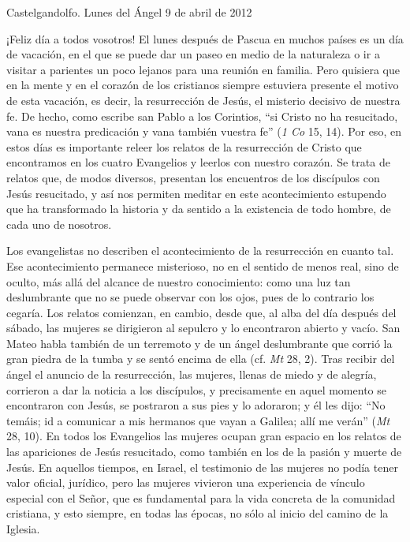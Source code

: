 			\begin{referencia}Castelgandolfo. Lunes del Ángel 9 de abril de 2012\end{referencia}
			
			\begin{body}¡Feliz día a todos vosotros! El lunes después de Pascua en muchos países es un día de vacación, en el que se puede dar un paseo en medio de la naturaleza o ir a visitar a parientes un poco lejanos para una reunión en familia. Pero quisiera que en la mente y en el corazón de los cristianos siempre estuviera presente el motivo de esta vacación, es decir, la resurrección de Jesús, el misterio decisivo de nuestra fe. De hecho, como escribe san Pablo a los Corintios, “si Cristo no ha resucitado, vana es nuestra predicación y vana también vuestra fe” (\textit{1 Co} 15, 14). Por eso, en estos días es importante releer los relatos de la resurrección de Cristo que encontramos en los cuatro Evangelios y leerlos con nuestro corazón. Se trata de relatos que, de modos diversos, presentan los encuentros de los discípulos con Jesús resucitado, y así nos permiten meditar en este acontecimiento estupendo que ha transformado la historia y da sentido a la existencia de todo hombre, de cada uno de nosotros.\end{body}
			
			\begin{body}Los evangelistas no describen el acontecimiento de la resurrección en cuanto tal. Ese acontecimiento permanece misterioso, no en el sentido de menos real, sino de oculto, más allá del alcance de nuestro conocimiento: como una luz tan deslumbrante que no se puede observar con los ojos, pues de lo contrario los cegaría. Los relatos comienzan, en cambio, desde que, al alba del día después del sábado, las mujeres se dirigieron al sepulcro y lo encontraron abierto y vacío. San Mateo habla también de un terremoto y de un ángel deslumbrante que corrió la gran piedra de la tumba y se sentó encima de ella (cf. \textit{Mt} 28, 2). Tras recibir del ángel el anuncio de la resurrección, las mujeres, llenas de miedo y de alegría, corrieron a dar la noticia a los discípulos, y precisamente en aquel momento se encontraron con Jesús, se postraron a sus pies y lo adoraron; y él les dijo: “No temáis; id a comunicar a mis hermanos que vayan a Galilea; allí me verán” (\textit{Mt} 28, 10). En todos los Evangelios las mujeres ocupan gran espacio en los relatos de las apariciones de Jesús resucitado, como también en los de la pasión y muerte de Jesús. En aquellos tiempos, en Israel, el testimonio de las mujeres no podía tener valor oficial, jurídico, pero las mujeres vivieron una experiencia de vínculo especial con el Señor, que es fundamental para la vida concreta de la comunidad cristiana, y esto siempre, en todas las épocas, no sólo al inicio del camino de la Iglesia.\end{body}
			
